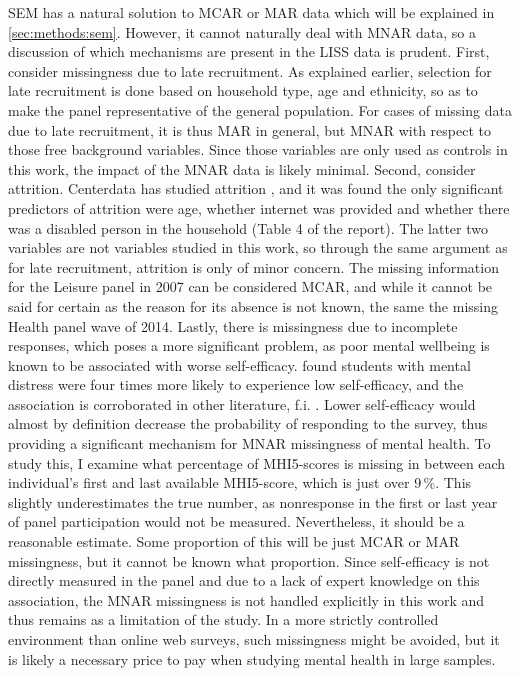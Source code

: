 SEM has a natural solution to MCAR or MAR data which will be explained in \cref{sec:methods:sem}.
However, it cannot naturally deal with MNAR data, so a discussion of which mechanisms are present in the LISS data is prudent.
First, consider missingness due to late recruitment. As explained earlier, selection for late recruitment is done based
on household type, age and ethnicity, so as to make the panel representative of the general population. For cases of missing
data due to late recruitment, it is thus MAR in general, but MNAR with respect to those free background variables.
Since those variables are only used as controls in this work, the impact of the MNAR data is likely minimal.
Second, consider attrition. Centerdata has studied attrition \cite{vos2009attrition}, and it was found the only significant
predictors of attrition were age, whether internet was provided and whether there was a disabled person
in the household (Table 4 of the report). The latter two variables are not variables studied in this work, so through
the same argument as for late recruitment, attrition is only of minor concern.
The missing information for the Leisure panel in 2007 can be considered MCAR, and while it cannot be said for certain as
the reason for its absence is not known, the same the missing Health panel wave of 2014.
Lastly, there is missingness due to incomplete responses, which poses a more significant problem, as
poor mental wellbeing is known to be associated with worse self-efficacy.
 found students with mental distress were four times more likely to experience low
self-efficacy, and the association is corroborated in other literature, f.i. .
Lower self-efficacy would almost by definition decrease the probability of responding to the survey, thus providing
a significant mechanism for MNAR missingness of mental health.
To study this, I examine what percentage of MHI5-scores is missing in between each individual's first and last
available MHI5-score, which is just over 9\,\%. This slightly underestimates the true number, as nonresponse
in the first or last year of panel participation would not be measured. Nevertheless, it should be a reasonable
estimate. Some proportion of this will be just MCAR or MAR missingness, but it cannot be known what proportion.
Since self-efficacy is not directly measured in the panel and due to a lack of expert knowledge on this association,
the MNAR missingness is not handled explicitly in this work and thus remains as a limitation of the study.
In a more strictly controlled environment than online web surveys, such missingness might be avoided, but it is likely
a necessary price to pay when studying mental health in large samples.
